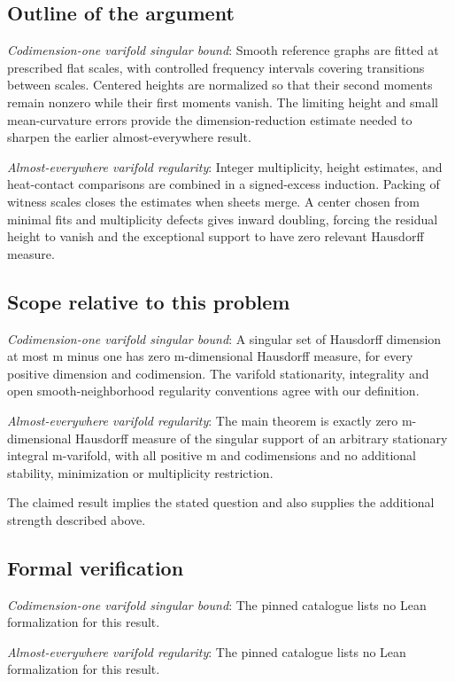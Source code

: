 \documentclass[11pt]{article}
\begin{document}
\subsection{Outline of the argument}
\textit{Codimension-one varifold singular bound}: Smooth reference graphs are fitted at prescribed flat scales, with controlled frequency intervals covering transitions between scales. Centered heights are normalized so that their second moments remain nonzero while their first moments vanish. The limiting height and small mean-curvature errors provide the dimension-reduction estimate needed to sharpen the earlier almost-everywhere result.

\textit{Almost-everywhere varifold regularity}: Integer multiplicity, height estimates, and heat-contact comparisons are combined in a signed-excess induction. Packing of witness scales closes the estimates when sheets merge. A center chosen from minimal fits and multiplicity defects gives inward doubling, forcing the residual height to vanish and the exceptional support to have zero relevant Hausdorff measure.

\subsection{Scope relative to this problem}
\textit{Codimension-one varifold singular bound}: A singular set of Hausdorff dimension at most m minus one has zero m-dimensional Hausdorff measure, for every positive dimension and codimension. The varifold stationarity, integrality and open smooth-neighborhood regularity conventions agree with our definition.

\textit{Almost-everywhere varifold regularity}: The main theorem is exactly zero m-dimensional Hausdorff measure of the singular support of an arbitrary stationary integral m-varifold, with all positive m and codimensions and no additional stability, minimization or multiplicity restriction.

The claimed result implies the stated question and also supplies the additional strength described above.

\subsection{Formal verification}
\textit{Codimension-one varifold singular bound}: The pinned catalogue lists no Lean formalization for this result.

\textit{Almost-everywhere varifold regularity}: The pinned catalogue lists no Lean formalization for this result.
\end{document}
